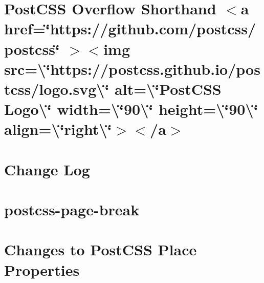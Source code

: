 \documentclass[twoside]{book}
\newcommand{\+}{\discretionary{\mbox{\scriptsize$\hookleftarrow$}}{}{}}
\begin{document}
\chapter{Post\+CSS Overflow Shorthand \texorpdfstring{$<$}{<}a href=\char`\"{}https\+://github.\+com/postcss/postcss\char`\"{} \texorpdfstring{$>$}{>}\texorpdfstring{$<$}{<}img src=\textbackslash{}\char`\"{}https\+://postcss.\+github.\+io/postcss/logo.\+svg\textbackslash{}\char`\"{} alt=\textbackslash{}\char`\"{}\+Post\+CSS Logo\textbackslash{}\char`\"{} width=\textbackslash{}\char`\"{}90\textbackslash{}\char`\"{} height=\textbackslash{}\char`\"{}90\textbackslash{}\char`\"{} align=\textbackslash{}\char`\"{}right\textbackslash{}\char`\"{}\texorpdfstring{$>$}{>}\texorpdfstring{$<$}{<}/a\texorpdfstring{$>$}{>}}
\label{md__c___users_vaishnavi_jadhav__desktop__developer_code_mean_stack_example_client_node_modules_pd1915c2f4c8da198951b18377ae32715}

\chapter{Change Log}
\label{md__c___users_vaishnavi_jadhav__desktop__developer_code_mean_stack_example_client_node_modules_p764104233d823192b2aacfee3bc4d29f}

\chapter{postcss-\/page-\/break}
\label{md__c___users_vaishnavi_jadhav__desktop__developer_code_mean_stack_example_client_node_modules_postcss_page_break__r_e_a_d_m_e}

\chapter{Changes to Post\+CSS Place Properties}
\label{md__c___users_vaishnavi_jadhav__desktop__developer_code_mean_stack_example_client_node_modules_postcss_place__c_h_a_n_g_e_l_o_g}

\end{document}
